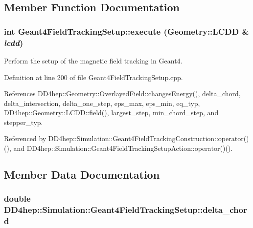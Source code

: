 \subsection{Member Function Documentation}
\hypertarget{struct_d_d4hep_1_1_simulation_1_1_geant4_field_tracking_setup_a357240d7fa878959f164ab2050598b8e}{
\subsubsection[{execute}]{\setlength{\rightskip}{0pt plus 5cm}int Geant4FieldTrackingSetup::execute ({\bf Geometry::LCDD} \& {\em lcdd})}}
\label{struct_d_d4hep_1_1_simulation_1_1_geant4_field_tracking_setup_a357240d7fa878959f164ab2050598b8e}


Perform the setup of the magnetic field tracking in Geant4. 

Definition at line 200 of file Geant4FieldTrackingSetup.cpp.

References DD4hep::Geometry::OverlayedField::changesEnergy(), delta\_\-chord, delta\_\-intersection, delta\_\-one\_\-step, eps\_\-max, eps\_\-min, eq\_\-typ, DD4hep::Geometry::LCDD::field(), largest\_\-step, min\_\-chord\_\-step, and stepper\_\-typ.

Referenced by DD4hep::Simulation::Geant4FieldTrackingConstruction::operator()(), and DD4hep::Simulation::Geant4FieldTrackingSetupAction::operator()().

\subsection{Member Data Documentation}
\hypertarget{struct_d_d4hep_1_1_simulation_1_1_geant4_field_tracking_setup_ac1e938991c5848a1a0cda7df729b5366}{
\subsubsection[{delta\_\-chord}]{\setlength{\rightskip}{0pt plus 5cm}double {\bf DD4hep::Simulation::Geant4FieldTrackingSetup::delta\_\-chord}}}
\label{struct_d_d4hep_1_1_simulation_1_1_geant4_field_tracking_setup_ac1e938991c5848a1a0cda7df729b5366}


